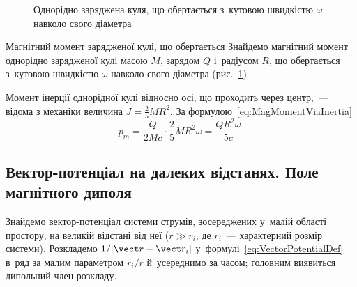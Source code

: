 \begin{figure}\centering
	\caption{Однорідно заряджена куля, що обертається з~кутовою швидкістю $\omega$ навколо
		свого діаметра\label{pic:GyromagneticSphere}}
\end{figure}

\begin{Example}[unbreakable]{Магнітний момент зарядженої кулі, що обертається}
	Знайдемо магнітний момент однорідно зарядженої кулі масою $M$, зарядом $Q$ і~радіусом $R$,
	що обертається з~кутовою швидкістю $\omega$ навколо свого діаметра
	(рис.~\ref{pic:GyromagneticSphere}).

	Момент інерції однорідної кулі відносно осі, що проходить через центр,~--- відома з
	механіки величина $J=\frac25 MR^2$. За формулою~\eqref{eq:MagMomentViaInertia}
	\begin{equation*}
		p_m = \frac{Q}{2Mc}\cdot\frac25 MR^2\omega = \frac{QR^2\omega}{5c}.
	\end{equation*}
\end{Example}


\subsection*{Вектор-потенціал на далеких відстанях. Поле магнітного диполя}


Знайдемо вектор-потенціал системи струмів, зосереджених у~малій області простору, на
великій відстані від неї ($r \gg r_i$, де $r_i$~--- характерний розмір системи).
Розкладемо $1/|\vect r - \vect r_i|$ у~формулі~\eqref{eq:VectorPotentialDef} в~ряд за
малим параметром $r_i/r$ й~усереднимо за часом; головним виявиться дипольний член розкладу.

